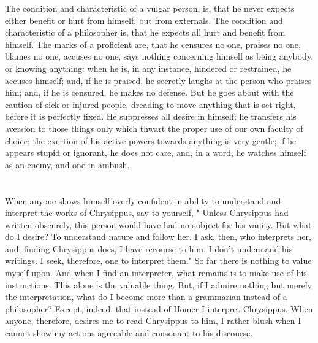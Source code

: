 \documentclass[12pt]{article}
\begin{document}
The condition and characteristic of a vulgar person, is, that
he never expects either benefit or hurt from himself, but from externals.
The condition and characteristic of a philosopher is, that he expects
all hurt and benefit from himself. The marks of a proficient are,
that he censures no one, praises no one, blames no one, accuses no
one, says nothing concerning himself as being anybody, or knowing
anything: when he is, in any instance, hindered or restrained, he
accuses himself; and, if he is praised, he secretly laughs at the
person who praises him; and, if he is censured, he makes no defense.
But he goes about with the caution of sick or injured people, dreading
to move anything that is set right, before it is perfectly fixed.
He suppresses all desire in himself; he transfers his aversion to
those things only which thwart the proper use of our own faculty of
choice; the exertion of his active powers towards anything is very
gentle; if he appears stupid or ignorant, he does not care, and, in
a word, he watches himself as an enemy, and one in ambush.

\section{}

When anyone shows himself overly confident in ability to understand
and interpret the works of Chrysippus, say to yourself, " Unless Chrysippus
had written obscurely, this person would have had no subject for his
vanity. But what do I desire? To understand nature and follow her.
I ask, then, who interprets her, and, finding Chrysippus does, I have
recourse to him. I don't understand his writings. I seek, therefore,
one to interpret them." So far there is nothing to value myself upon.
And when I find an interpreter, what remains is to make use of his
instructions. This alone is the valuable thing. But, if I admire nothing
but merely the interpretation, what do I become more than a grammarian
instead of a philosopher? Except, indeed, that instead of Homer I
interpret Chrysippus. When anyone, therefore, desires me to read Chrysippus
to him, I rather blush when I cannot show my actions agreeable and
consonant to his discourse. 

\section{}
\end{document}
